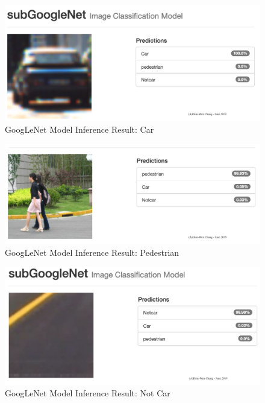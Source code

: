 \documentclass[10pt,journal,compsoc]{IEEEtran}
\begin{document}
\begin{figure}[thpb]
      \centering
      \includegraphics[width=\linewidth]{CarInferenceResult.png}
      \caption{GoogLeNet Model Inference Result: Car}
      \label{fig:robot1}
\end{figure}
\begin{figure}[thpb]
      \centering
      \includegraphics[width=\linewidth]{GoogLenetPed.png}
      \caption{GoogLeNet Model Inference Result: Pedestrian}
      \label{fig:robot1}
\end{figure}
\begin{figure}[thpb]
      \centering
      \includegraphics[width=\linewidth]{notCarInferenceGoodResult.png}
      \caption{GoogLeNet Model Inference Result: Not Car}
      \label{fig:robot1}
\end{figure}
\end{document}
